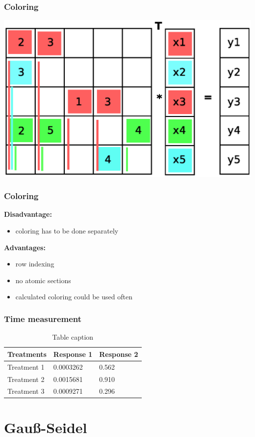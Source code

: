 \documentclass{beamer}
\begin{document}
\begin{frame}
\frametitle{Coloring}
\includegraphics[width=0.8\linewidth]{graphic/coloringT10.eps}
\end{frame}

\begin{frame}
\frametitle{Coloring}
\textbf{Disadvantage:}
\begin{itemize}
\item coloring has to be done separately
\end{itemize}

\textbf{Advantages:}
\begin{itemize}
\item row indexing
\item no atomic sections
\item calculated coloring could be used often
\end{itemize}
\end{frame}

\begin{frame}
\frametitle{Time measurement}
\begin{table}
\begin{tabular}{l l l}
\toprule
\textbf{Treatments} & \textbf{Response 1} & \textbf{Response 2}\\
\midrule
Treatment 1 & 0.0003262 & 0.562 \\
Treatment 2 & 0.0015681 & 0.910 \\
Treatment 3 & 0.0009271 & 0.296 \\
\bottomrule
\end{tabular}
\caption{Table caption}
\end{table}
\end{frame}

\section{Gau\ss-Seidel}
\end{document}
